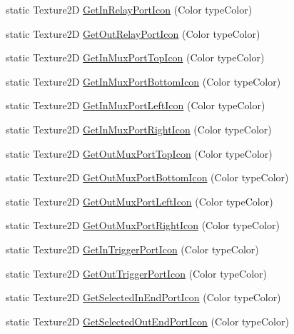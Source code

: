 \begin{DoxyCompactItemize}
\item 
static Texture2\+D \hyperlink{classi_c_s___port_icons_ab6b214920ab9e69f328734272db3be54}{Get\+In\+Relay\+Port\+Icon} (Color type\+Color)
\item 
static Texture2\+D \hyperlink{classi_c_s___port_icons_a6ac6f759428a39b95cbdf3aee33c51a6}{Get\+Out\+Relay\+Port\+Icon} (Color type\+Color)
\item 
static Texture2\+D \hyperlink{classi_c_s___port_icons_a0317531ec763571b74967fb05e8c09fa}{Get\+In\+Mux\+Port\+Top\+Icon} (Color type\+Color)
\item 
static Texture2\+D \hyperlink{classi_c_s___port_icons_a61f5c3a703c58adcb9ec5a6b6f696f9c}{Get\+In\+Mux\+Port\+Bottom\+Icon} (Color type\+Color)
\item 
static Texture2\+D \hyperlink{classi_c_s___port_icons_a7c91afd20853fa541085a3448735f4cd}{Get\+In\+Mux\+Port\+Left\+Icon} (Color type\+Color)
\item 
static Texture2\+D \hyperlink{classi_c_s___port_icons_a066aa6021e8e31b457e1c4a0298b8b75}{Get\+In\+Mux\+Port\+Right\+Icon} (Color type\+Color)
\item 
static Texture2\+D \hyperlink{classi_c_s___port_icons_a513b2ae844173659566cd3ff550e0ea8}{Get\+Out\+Mux\+Port\+Top\+Icon} (Color type\+Color)
\item 
static Texture2\+D \hyperlink{classi_c_s___port_icons_a9ab5d6a0515a01c241cb0b0d32908267}{Get\+Out\+Mux\+Port\+Bottom\+Icon} (Color type\+Color)
\item 
static Texture2\+D \hyperlink{classi_c_s___port_icons_a8580e61a924f3e1e3bd47c945588cc17}{Get\+Out\+Mux\+Port\+Left\+Icon} (Color type\+Color)
\item 
static Texture2\+D \hyperlink{classi_c_s___port_icons_ac7afc6ff93b6b395489b1aee3d8f9fdb}{Get\+Out\+Mux\+Port\+Right\+Icon} (Color type\+Color)
\item 
static Texture2\+D \hyperlink{classi_c_s___port_icons_a8ed5e1c1785d6c884536863b1a8e4fda}{Get\+In\+Trigger\+Port\+Icon} (Color type\+Color)
\item 
static Texture2\+D \hyperlink{classi_c_s___port_icons_a3dcf49d611b302b5f360a87046ad60af}{Get\+Out\+Trigger\+Port\+Icon} (Color type\+Color)
\item 
static Texture2\+D \hyperlink{classi_c_s___port_icons_a7ad6212f72fcc29233e0183f84d69157}{Get\+Selected\+In\+End\+Port\+Icon} (Color type\+Color)
\item 
static Texture2\+D \hyperlink{classi_c_s___port_icons_ab8a75457384f09e6eb5275746b434e67}{Get\+Selected\+Out\+End\+Port\+Icon} (Color type\+Color)

\end{DoxyCompactItemize}
